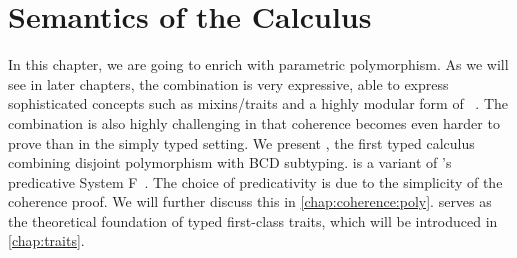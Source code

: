 
\chapter{Semantics of the \fnamee Calculus}
\label{chap:fi}

In this chapter, we are going to enrich \namee with parametric polymorphism. As
we will see in later chapters, the combination is very expressive, able to express sophisticated
concepts such as mixins/traits and a highly modular form of \visitor~\citep{oliveira09modular, togersen:2004}. The
combination is also highly challenging in that coherence becomes even harder to
prove than in the simply typed setting. We present \fnamee, the first typed
calculus combining disjoint polymorphism with BCD subtyping. \fnamee is a
variant of \citeauthor{leivant1991finitely}'s predicative System
F~\citep{leivant1991finitely}. The choice of predicativity is due to the
simplicity of the coherence proof. We will further discuss this in
\cref{chap:coherence:poly}. \fnamee serves as the theoretical foundation of
typed first-class traits, which will be introduced in \cref{chap:traits}.








